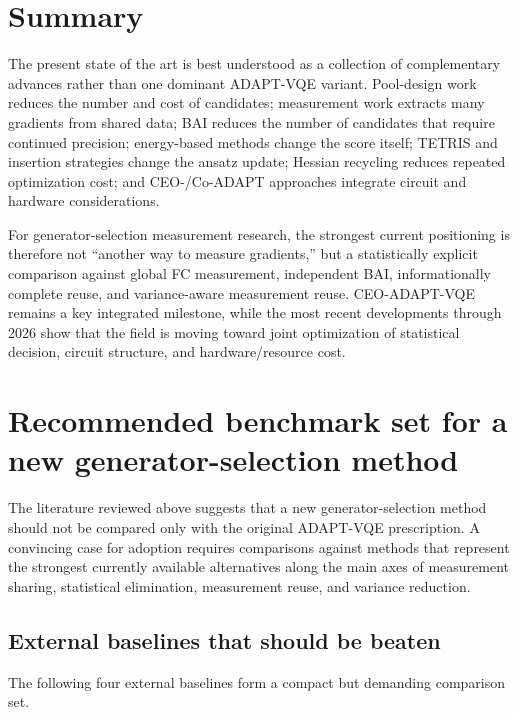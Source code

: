 \documentclass[11pt]{article}
\begin{document}
\section{Summary}

The present state of the art is best understood as a collection of complementary advances rather than one dominant ADAPT-VQE variant. Pool-design work reduces the number and cost of candidates; measurement work extracts many gradients from shared data; BAI reduces the number of candidates that require continued precision; energy-based methods change the score itself; TETRIS and insertion strategies change the ansatz update; Hessian recycling reduces repeated optimization cost; and CEO-/Co-ADAPT approaches integrate circuit and hardware considerations.

For generator-selection measurement research, the strongest current positioning is therefore not ``another way to measure gradients,'' but a statistically explicit comparison against global FC measurement, independent BAI, informationally complete reuse, and variance-aware measurement reuse. CEO-ADAPT-VQE remains a key integrated milestone, while the most recent developments through 2026 show that the field is moving toward joint optimization of statistical decision, circuit structure, and hardware/resource cost.



\section{Recommended benchmark set for a new generator-selection method}
\label{sec:recommended-benchmarks}

The literature reviewed above suggests that a new generator-selection method should not be compared only with the original ADAPT-VQE prescription.  A convincing case for adoption requires comparisons against methods that represent the strongest currently available alternatives along the main axes of measurement sharing, statistical elimination, measurement reuse, and variance reduction.

\subsection{External baselines that should be beaten}

The following four external baselines form a compact but demanding comparison set.
\end{document}
